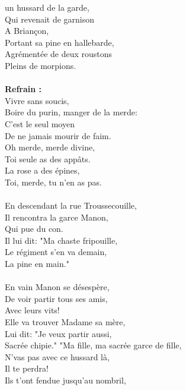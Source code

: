 
 un hussard de la garde,
\\Qui revenait de garnison
\\A Briançon,
\\Portant sa pine en hallebarde,
\\Agrémentée de deux roustons
\\Pleins de morpions.
\\\\\textbf{Refrain :}
\\Vivre sans soucis,
\\Boire du purin, manger de la merde:
\\C'est le seul moyen
\\De ne jamais mourir de faim.
\\Oh merde, merde divine,
\\Toi seule as des appâts.
\\La rose a des épines,
\\Toi, merde, tu n'en as pas.
\\\\En descendant la rue Troussecouille,
\\Il rencontra la garce Manon,
\\Qui pue du con.
\\Il lui dit: "Ma chaste fripouille,
\\Le régiment s'en va demain,
\\La pine en main."
\\\\En vain Manon se désespère,
\\De voir partir tous ses amis,
\\Avec leurs vits!
\\Elle va trouver Madame sa mère,
\\Lui dit: "Je veux partir aussi,
\\Sacrée chipie."
\breakpage
"Ma fille, ma sacrée garce de fille,
\\N'vas pas avec ce hussard là,
\\Il te perdra!
\\Ils t'ont fendue jusqu'au nombril,
